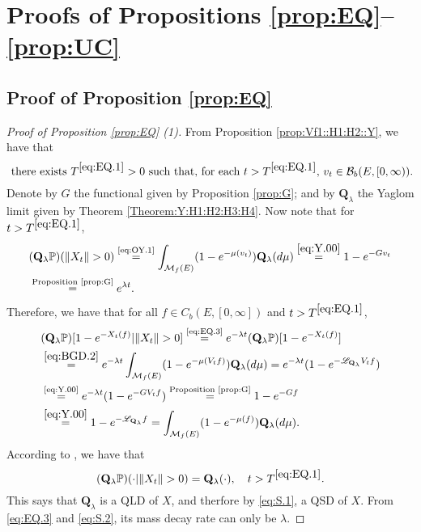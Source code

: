\documentclass[12pt,a4paper]{amsart}
\numberwithin{equation}{section}
\theoremstyle{plain}
\theoremstyle{definition}
\theoremstyle{remark}
\begin{document}
\section{Proofs of Propositions \ref{prop:EQ}--\ref{prop:UC}}

\subsection{Proof of Proposition \ref{prop:EQ}} \label{sec:EQ}
\begin{proof}[Proof of Proposition \ref{prop:EQ} (1)]
	From Proposition \ref{prop:Vf1::H1:H2::Y}, we have that
	\begin{equation} \label{eq:EQ.1}
	\text{ there exists $T^{\eqref{eq:EQ.1}}>0$ such that, for each $t>T^{\eqref{eq:EQ.1}}$, $v_t \in \mathcal B_b(E,[0,\infty))$.}
	\end{equation}	
	Denote by $G$ the functional given by Proposition \ref{prop:G}; and by $\mathbf Q_\lambda$ the Yaglom limit given by Theorem \ref{Theorem:Y:H1:H2:H3:H4}.
Now note that
	for $t> T^{\eqref{eq:EQ.1}}$,
	\begin{align}
	&(\mathbf Q_\lambda \mathbb P) (\|X_t\|>0)
	\overset{\text{\eqref{eq:OY.1}}}= \int_{\mathcal M_f(E)}(1-e^{-\mu(v_t)})\mathbf Q_\lambda (d\mu)
	\overset{\eqref{eq:Y.00}}= 1 - e^{-G v_t}
	\\&\overset{\text{Proposition \ref{prop:G}}}= e^{\lambda t}.  \label{eq:EQ.3}
	\end{align}
	Therefore, we have that for all $f\in C_b(E,[0,\infty])$ and $t > T^{\eqref{eq:EQ.1}}$,
	\begin{align}
	&(\mathbf Q_\lambda \mathbb P)[1 - e^{-X_t(f)} | \|X_t\| > 0]
	\overset{\text{\eqref{eq:EQ.3}}}= e^{- \lambda t} (\mathbf Q_\lambda \mathbb P)[1- e^{-X_t(f)}]
	\\& \overset{\eqref{eq:BGD.2}}= e^{- \lambda t} \int_{\mathcal M_f(E)} (1- e^{-\mu(V_tf)} ) \mathbf Q_\lambda (d\mu)
	= e^{-\lambda t} (1 - e^{- \mathscr L_{\mathbf Q_\lambda} V_tf})
	\\& \overset{\text{\eqref{eq:Y.00}}}= e^{-\lambda t} (1 - e^{- G V_tf})
	\overset{\text{Proposition \ref{prop:G}}}= 1 - e^{-Gf}
	\\&\overset{\eqref{eq:Y.00}}= 1- e^{-\mathscr L_{\mathbf Q_\lambda} f}
	=\int_{\mathcal M_f(E)} (1 - e^{-\mu(f)}) \mathbf Q_\lambda (d\mu).
	\end{align}
	According to \cite[Theorem 1.17]{Li2011MeasureValued}, we have that
	\[
	(\mathbf Q_\lambda \mathbb P)(\cdot |\|X_t\| > 0) = \mathbf Q_{\lambda}(\cdot), \quad t > T^{\eqref{eq:EQ.1}}.
	\]
	This says that $\mathbf Q_\lambda$ is a QLD of $X$, and therfore by \eqref{eq:S.1}, a QSD of $X$.
	From \eqref{eq:EQ.3} and \eqref{eq:S.2}, its mass decay rate can only be $\lambda$.
\end{proof}
\end{document}
